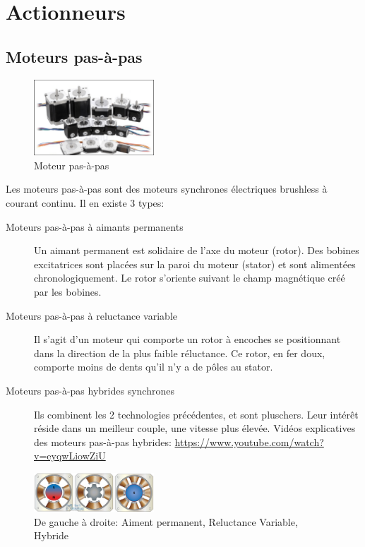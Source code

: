 \documentclass[a4paper, 11pt]{report}
\begin{document}
\chapter{Actionneurs}

\section{Moteurs pas-à-pas}

\begin{figure}[h!]
\begin{centering}
\includegraphics[width=0.4\textwidth]{images/MoteurPasAPas.png}
\caption{Moteur pas-à-pas}
\par\end{centering}
\end{figure}

Les moteurs pas-à-pas sont des moteurs synchrones électriques brushless à courant continu. Il en existe 3 types:
\begin{description}
\item[Moteurs pas-à-pas à aimants permanents] Un aimant permanent est solidaire de l'axe du moteur (rotor). Des bobines excitatrices sont placées sur la paroi du moteur (stator) et sont alimentées chronologiquement. Le rotor s'oriente suivant le champ magnétique créé par les bobines.
\item[Moteurs pas-à-pas à reluctance variable] Il s'agit d'un moteur qui comporte un rotor à encoches se positionnant dans la direction de la plus faible réluctance. Ce rotor, en fer doux, comporte moins de dents qu'il n'y a de pôles au stator.
\item[Moteurs pas-à-pas hybrides synchrones]Ils combinent les 2 technologies précédentes, et sont pluschers. Leur intérêt réside dans un meilleur couple, une vitesse plus élevée. Vidéos explicatives des moteurs pas-à-pas hybrides: \url{https://www.youtube.com/watch?v=eyqwLiowZiU}
\end{description}

\begin{figure}[h!]
\begin{centering}
\includegraphics[width=0.4\textwidth]{images/DifferentsMPP.jpg}
\caption{De gauche à droite: Aiment permanent, Reluctance Variable, Hybride}
\par\end{centering}
\end{figure}
\end{document}
